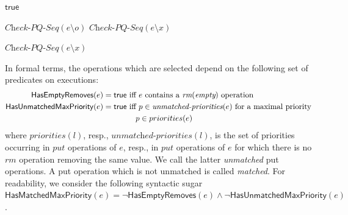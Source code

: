 \begin{algorithm}[t]

{\Return $\mathsf{true}$\;}

{
    {
        \KwRet $\textit{Check-PQ-Seq}(e \setminus o)$\;
    }
}
{
    {
        \KwRet $\textit{Check-PQ-Seq}(e \setminus x)$\;
    }
}

\Else
{
    {
        \KwRet $\textit{Check-PQ-Seq}(e \setminus x)$\;
    }
}
\caption{$\textit{Check-PQ-Seq}$}
\label{alg:seq_check}
\end{algorithm}


In formal terms, the operations which are selected depend on the following set of predicates on executions:
{\small
\begin{align*}
\mathsf{HasEmptyRemoves}(e)=\mathsf{true} & \mbox{ iff  $e$ contains a $\textit{rm}(\textit{empty})$ operation} \\
\mathsf{HasUnmatchedMaxPriority}(e)=\mathsf{true} & \mbox{ iff $p\in \textit{unmatched-priorities}(e)$ for a maximal priority} \\
&\hspace{4mm}\mbox{$p\in priorities(e)$}
\end{align*}}
where $\textit{priorities}(l)$, resp., $\textit{unmatched-priorities}(l)$, is the set of priorities occurring in $\textit{put}$ operations of $e$, resp., in $\textit{put}$ operations of $e$ for which there is no $\textit{rm}$ operation removing the same value. We call the latter \emph{unmatched} put operations. A put operation which is not unmatched is called \emph{matched}. For readability, we consider the following syntactic sugar $\mathsf{HasMatchedMaxPriority}(e)=\neg \mathsf{HasEmptyRemoves}(e)\land \neg \mathsf{HasUnmatchedMaxPriority}(e)$.

